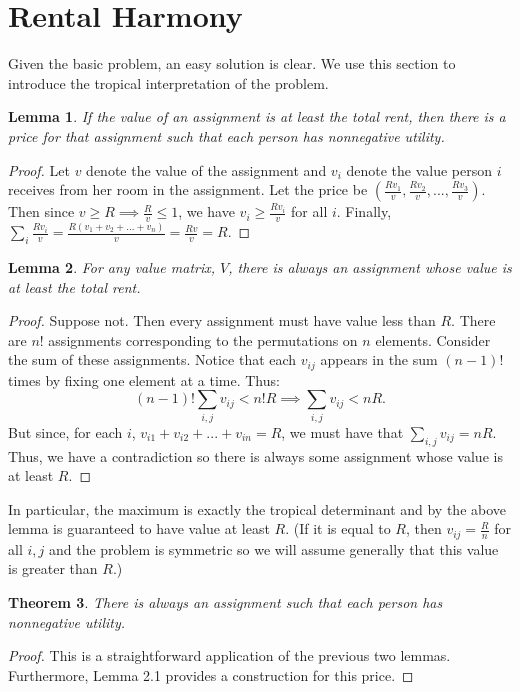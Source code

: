 \documentclass[12pt]{article}
\newtheorem{thm}{Theorem}[section]
\newtheorem{lem}[thm]{Lemma}
\begin{document}
\section{Rental  Harmony}

Given the basic problem, an easy solution is clear. We use this section to introduce the tropical interpretation of the problem. 

\begin{lem}
If the value of an assignment is at least the total rent, then there is a price for that assignment such that each person has nonnegative utility.
\end{lem}

\begin{proof}
Let $v$ denote the value of the assignment and $v_i$ denote the value person $i$ receives from her room in the assignment. Let the price be $(\frac{Rv_1}{v},\frac{Rv_2}{v},...,\frac{Rv_3}{v})$. Then since $v\ge R\implies \frac{R}{v}\le1$, we have $v_i\ge \frac{Rv_i}{v}$ for all $i$. Finally, $\sum_i \frac{Rv_i}{v}=\frac{R(v_1+v_2+...+v_n)}{v}=\frac{Rv}{v}=R$.
\end{proof}

\begin{lem}
For any value matrix, $V$, there is always an assignment whose value is at least the total rent. 
\end{lem}

\begin{proof}
Suppose not. Then every assignment must have value less than $R$. There are $n!$ assignments corresponding to the permutations on $n$ elements. Consider the sum of these assignments. Notice that each $v_{ij}$ appears in the sum $(n-1)!$ times by fixing one element at a time. Thus: \[(n-1)!\sum_{i,j} v_{ij}< n!R\implies\sum_{i,j}v_{ij}<nR.\]
But since, for each $i$, $v_{i1}+v_{i2}+...+v_{in}=R$, we must have that $\sum_{i,j}v_{ij}=nR$. Thus, we have a contradiction so there is always some assignment whose value is at least $R$.
\end{proof}
\noindent
In particular, the maximum is exactly the tropical determinant and by the above lemma is guaranteed to have value at least $R$. (If it is equal to $R$, then $v_{ij}=\frac{R}{n}$ for all $i,j$ and the problem is symmetric so we will assume generally that this value is greater than $R$.)

\begin{thm}
There is always an assignment such that each person has nonnegative utility.
\end{thm}

\begin{proof}
This is a straightforward application of the previous two lemmas. Furthermore, Lemma 2.1 provides a construction for this price.
\end{proof}


\noindent




\end{document}
